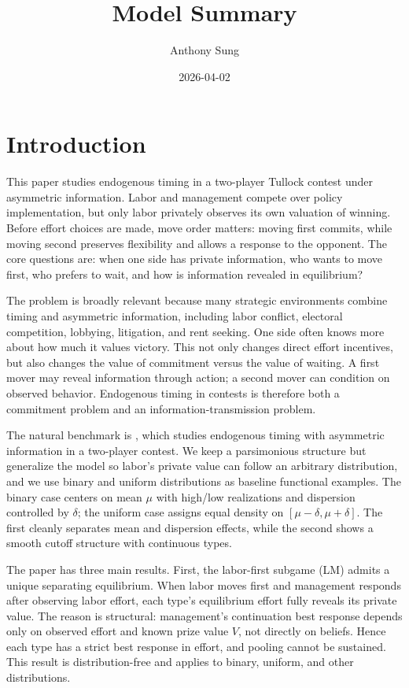 \documentclass[
  english,
  a4paper,
  12pt]{article}
\title{Model Summary}
\author{Anthony Sung}
\date{2026-04-02}
\renewcommand*\contentsname{Table of contents}
\newcommand\contentsname{Table of contents}
\theoremstyle{plain}
\theoremstyle{plain}
\theoremstyle{definition}
\theoremstyle{remark}
\begin{document}
\maketitle

\renewcommand*\contentsname{Table of contents}
{
\hypersetup{linkcolor=}
\setcounter{tocdepth}{3}
\tableofcontents
}

\section{Introduction}\label{sec-intro}

This paper studies endogenous timing in a two-player Tullock contest
under asymmetric information. Labor and management compete over policy
implementation, but only labor privately observes its own valuation of
winning. Before effort choices are made, move order matters: moving
first commits, while moving second preserves flexibility and allows a
response to the opponent. The core questions are: when one side has
private information, who wants to move first, who prefers to wait, and
how is information revealed in equilibrium?

The problem is broadly relevant because many strategic environments
combine timing and asymmetric information, including labor conflict,
electoral competition, lobbying, litigation, and rent seeking. One side
often knows more about how much it values victory. This not only changes
direct effort incentives, but also changes the value of commitment
versus the value of waiting. A first mover may reveal information
through action; a second mover can condition on observed behavior.
Endogenous timing in contests is therefore both a commitment problem and
an information-transmission problem.

The natural benchmark is \citet{fu2006}, which studies endogenous timing
with asymmetric information in a two-player contest. We keep a
parsimonious structure but generalize the model so labor's private value
can follow an arbitrary distribution, and we use binary and uniform
distributions as baseline functional examples. The binary case centers
on mean \(\mu\) with high/low realizations and dispersion controlled by
\(\delta\); the uniform case assigns equal density on
\([\mu-\delta,\mu+\delta]\). The first cleanly separates mean and
dispersion effects, while the second shows a smooth cutoff structure
with continuous types.

The paper has three main results. First, the labor-first subgame (LM)
admits a unique separating equilibrium. When labor moves first and
management responds after observing labor effort, each type's
equilibrium effort fully reveals its private value. The reason is
structural: management's continuation best response depends only on
observed effort and known prize value \(V\), not directly on beliefs.
Hence each type has a strict best response in effort, and pooling cannot
be sustained. This result is distribution-free and applies to binary,
uniform, and other distributions.
\end{document}
